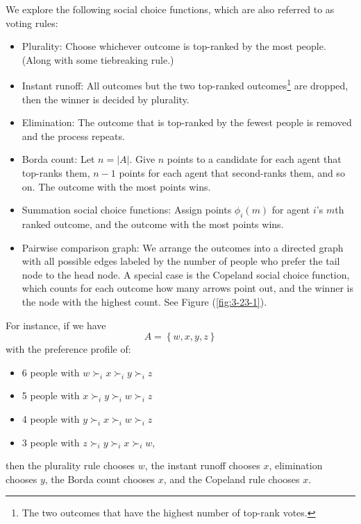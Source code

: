 We explore the following social choice functions, which are also referred to as voting rules:
\begin{definition}
	\begin{itemize}
		\item Plurality: Choose whichever outcome is top-ranked by the most people. (Along with some tiebreaking rule.)
		\item Instant runoff: All outcomes but the two top-ranked outcomes\footnote{The two outcomes that have the highest number of top-rank votes.} are dropped, then the winner is decided by plurality.
		\item Elimination: The outcome that is top-ranked by the fewest people is removed and the process repeats.
		\item Borda count: Let $n = \left| A \right|$. Give $n$ points to a candidate for each agent that top-ranks them, $n-1$ points for each agent that second-ranks them, and so on. The outcome with the most points wins.
		\item Summation social choice functions: Assign points $\phi_i(m)$ for agent $i$'s $m$th ranked outcome, and the outcome with the most points wins.
		\item Pairwise comparison graph: We arrange the outcomes into a directed graph with all possible edges labeled by the number of people who prefer the tail node to the head node. A special case is the Copeland social choice function, which counts for each outcome how many arrows point out, and the winner is the node with the highest count. See Figure (\ref{fig:3-23-1}).
	\end{itemize}
\end{definition}


\begin{example}
	For instance, if we have \[
		A = \left\{w,x,y,z\right\}
	\] with the preference profile of: 
	\begin{itemize}
		\item 6 people with $w \succ_i x \succ_i y \succ_i z$
		\item 5 people with $x \succ_i y \succ_i w \succ_i z$
		\item 4 people with $y \succ_i x \succ_i w \succ_i z$
		\item 3 people with $z \succ_i y \succ_i x \succ_i w$,
	\end{itemize}
	then the plurality rule chooses $w$, the instant runoff chooses $x$, elimination chooses $y$, the Borda count chooses $x$, and the Copeland rule chooses $x$.
\end{example}

